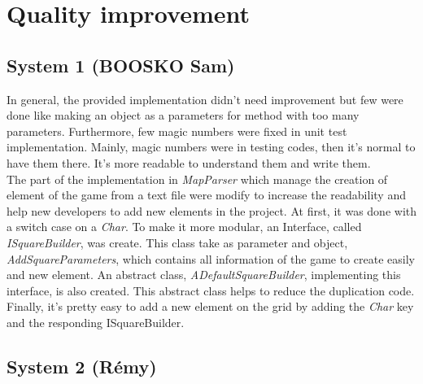 \documentclass[]{article}
\begin{document}
\newpage
\clearpage
\section{Quality improvement}
\subsection{System 1 (BOOSKO Sam)}

In general, the provided implementation didn't need improvement but few were done like making an object as a parameters for method with too many parameters. Furthermore, few magic numbers were fixed in unit test implementation. Mainly, magic numbers were in testing codes, then it's normal to have them there. It's more readable to understand them and write them.\\

The part of the implementation in \textit{MapParser} which manage the creation of element of the game from a text file were modify to increase the readability and help new developers to add new elements in the project. At first, it was done with a switch case on a \textit{Char}. To make it more modular, an Interface, called \textit{ISquareBuilder}, was create. This class take as parameter and object, \textit{AddSquareParameters}, which contains all information of the game to create easily and new element. An abstract class, \textit{ADefaultSquareBuilder}, implementing this interface, is also created. This abstract class helps to reduce the duplication code. Finally, it's pretty easy to add a new element on the grid by adding the \textit{Char} key and the responding ISquareBuilder. \\
\newpage

\subsection{System 2 (Rémy)}
\end{document}
